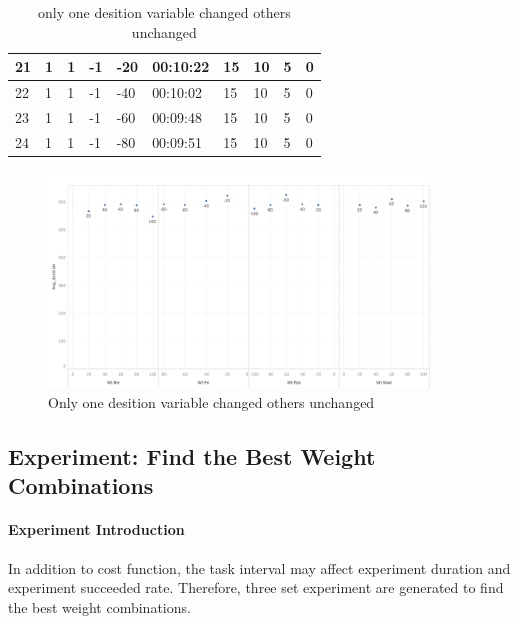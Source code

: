\begin{table}[]
{\begin{tabular}{|l|l|l|l|l|l|l|l|l|l|}
21      & 1       & 1        & -1      & -20     & 00:10:22 & 15    & 10        & 5       & 0        \\ \hline
22      & 1       & 1        & -1      & -40     & 00:10:02 & 15    & 10        & 5       & 0        \\ \hline
23      & 1       & 1        & -1      & -60     & 00:09:48 & 15    & 10        & 5       & 0        \\ \hline
24      & 1       & 1        & -1      & -80     & 00:09:51 & 15    & 10        & 5       & 0        \\ \hline
\end{tabular}}
\caption{only one desition variable changed others unchanged}
\label{tab:only_one_desition_variable_changed}
\end{table}

\begin{figure}[htbp]
    \centering
    \includegraphics[width = 0.9\textwidth]{content/images/ch5/one_decision_variable.png}
    \caption{Only one desition variable changed others unchanged}
    \label{fig:only_one_desition_variable_changed}
\end{figure}

\subsection{Experiment: Find the Best Weight Combinations}
\paragraph{Experiment Introduction}
In addition to cost function, the task interval may affect experiment duration and experiment succeeded rate. Therefore, three set experiment are generated to find the best weight combinations. 
 

